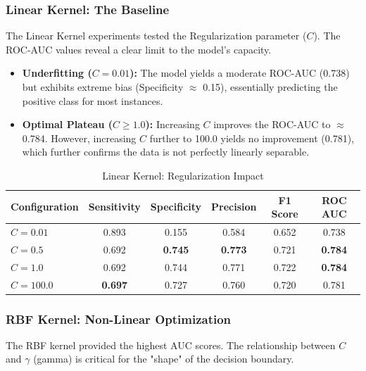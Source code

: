 \documentclass[12pt,a4paper]{article}
\begin{document}
\subsubsection*{Linear Kernel: The Baseline}
The Linear Kernel experiments tested the Regularization parameter ($C$). The ROC-AUC values reveal a clear limit to the model's capacity.

\begin{itemize}
    \item \textbf{Underfitting ($C=0.01$):} The model yields a moderate ROC-AUC (0.738) but exhibits extreme bias (Specificity $\approx$ 0.15), essentially predicting the positive class for most instances.
    \item \textbf{Optimal Plateau ($C \ge 1.0$):} Increasing $C$ improves the ROC-AUC to $\approx$ 0.784. However, increasing $C$ further to 100.0 yields no improvement (0.781), which further confirms the data is not perfectly linearly separable.
\end{itemize}

\begin{table}[h!]
\centering
\begin{tabular}{lccccc}
\toprule
\textbf{Configuration} & \textbf{Sensitivity} & \textbf{Specificity} & \textbf{Precision} & \textbf{F1 Score} & \textbf{ROC AUC} \\
\midrule
$C=0.01$ & 0.893 & 0.155 & 0.584 & 0.652 & 0.738 \\
\rowcolor{gray!10} $C=0.5$ & 0.692 & \textbf{0.745} & \textbf{0.773} & 0.721 & \textbf{0.784} \\
$C=1.0$ & 0.692 & 0.744 & 0.771 & 0.722 & \textbf{0.784} \\
$C=100.0$ & \textbf{0.697} & 0.727 & 0.760 & 0.720 & 0.781 \\
\bottomrule
\end{tabular}
\caption{Linear Kernel: Regularization Impact}
\end{table}

\subsubsection*{RBF Kernel: Non-Linear Optimization}
The RBF kernel provided the highest AUC scores. The relationship between $C$ and $\gamma$ (gamma) is critical for the "shape" of the decision boundary.
\end{document}
